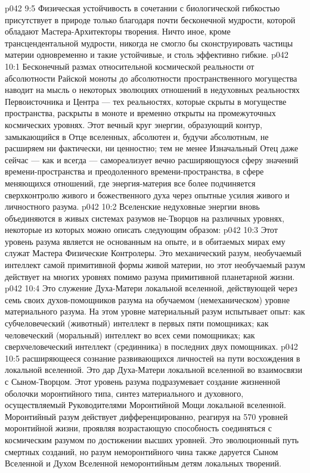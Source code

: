 \vs p042 9:5 Физическая устойчивость в сочетании с биологической гибкостью присутствует в природе только благодаря почти бесконечной мудрости, которой обладают Мастера\hyp{}Архитекторы творения. Ничто иное, кроме трансцендентальной мудрости, никогда не смогло бы сконструировать частицы материи одновременно и такие устойчивые, и столь эффективно гибкие.
\vs p042 10:1 Бесконечный размах относительной космической реальности от абсолютности Райской моноты до абсолютности пространственного могущества наводит на мысль о некоторых эволюциях отношений в недуховных реальностях Первоисточника и Центра --- тех реальностях, которые скрыты в могуществе пространства, раскрыты в моноте и временно открыты на промежуточных космических уровнях. Этот вечный круг энергии, образующий контур, замыкающийся в Отце вселенных, абсолютен и, будучи абсолютным, не расширяем ни фактически, ни ценностно; тем не менее Изначальный Отец даже сейчас --- как и всегда --- самореализует вечно расширяющуюся сферу значений времени\hyp{}пространства и преодоленного времени\hyp{}пространства, в сфере меняющихся отношений, где энергия\hyp{}материя все более подчиняется сверхконтролю живого и божественного духа через опытные усилия живого и личностного разума.
\vs p042 10:2 Вселенские недуховные энергии вновь объединяются в живых системах разумов не\hyp{}Творцов на различных уровнях, некоторые из которых можно описать следующим образом:
\vs p042 10:3 \bibnobreakspace {} Этот уровень разума является не основанным на опыте, и в обитаемых мирах ему служат Мастера Физические Контролеры. Это механический разум, необучаемый интеллект самой примитивной формы живой материи, но этот необучаемый разум действует на многих уровнях помимо разума примитивной планетарной жизни.
\vs p042 10:4 \bibnobreakspace {} Это служение Духа\hyp{}Матери локальной вселенной, действующей через семь своих духов\hyp{}помощников разума на обучаемом (немеханическом) уровне материального разума. На этом уровне материальный разум испытывает опыт: как субчеловеческий (животный) интеллект в первых пяти помощниках; как человеческий (моральный) интеллект во всех семи помощниках; как сверхчеловеческий интеллект (срединника) в последних двух помощниках.
\vs p042 10:5 \bibnobreakspace {} расширяющееся сознание развивающихся личностей на пути восхождения в локальной вселенной. Это дар Духа\hyp{}Матери локальной вселенной во взаимосвязи с Сыном\hyp{}Творцом. Этот уровень разума подразумевает создание жизненной оболочки моронтийного типа, синтез материального и духовного, осуществляемый Руководителями Моронтийной Мощи локальной вселенной. Моронтийный разум действует дифференцированно, реагируя на 570 уровней моронтийной жизни, проявляя возрастающую способность соединяться с космическим разумом по достижении высших уровней. Это эволюционный путь смертных созданий, но разум неморонтийного чина также даруется Сыном Вселенной и Духом Вселенной неморонтийным детям локальных творений.
